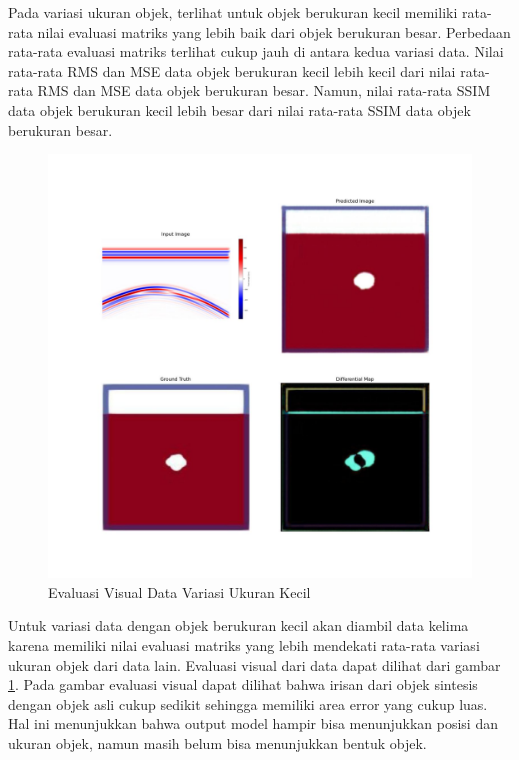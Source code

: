 Pada variasi ukuran objek, terlihat untuk objek berukuran kecil memiliki rata-rata nilai evaluasi matriks yang lebih baik dari objek berukuran besar. 
Perbedaan rata-rata evaluasi matriks terlihat cukup jauh di antara kedua variasi data. 
Nilai rata-rata RMS dan MSE data objek berukuran kecil lebih kecil dari nilai rata-rata RMS dan MSE data objek berukuran besar. 
Namun, nilai rata-rata SSIM data objek berukuran kecil lebih besar dari nilai rata-rata SSIM data objek berukuran besar. 

\begin{figure}[ht]
  \centering
  \includegraphics[scale=0.16]{gambar/diffMapKecil.jpg}
  \caption{Evaluasi Visual Data Variasi Ukuran Kecil}
  \label{fig:diffmapkecil}
\end{figure}

Untuk variasi data dengan objek berukuran kecil akan diambil data kelima karena memiliki nilai evaluasi matriks yang lebih mendekati rata-rata variasi ukuran objek dari data lain. 
Evaluasi visual dari data dapat dilihat dari gambar \ref{fig:diffmapkecil}. 
Pada gambar evaluasi visual dapat dilihat bahwa irisan dari objek sintesis dengan objek asli cukup sedikit sehingga memiliki area error yang cukup luas. 
Hal ini menunjukkan bahwa output model hampir bisa menunjukkan posisi dan ukuran objek, namun masih belum bisa menunjukkan bentuk objek.\\

